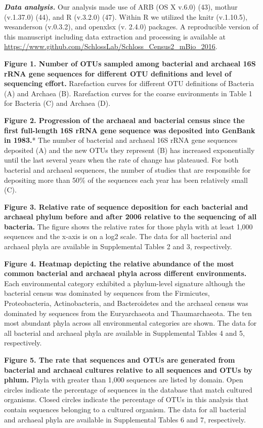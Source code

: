 \documentclass[11pt,]{article}
\begin{document}
\textbf{\emph{Data analysis.}} Our analysis made use of ARB (OS X v.6.0)
(43), mothur (v.1.37.0) (44), and R (v.3.2.0) (47). Within R we utilized
the knitr (v.1.10.5), wesanderson (v.0.3.2), and openxlsx (v. 2.4.0)
packages. A reproducible version of this manuscript including data
extraction and processing is available at
\url{https://www.github.com/SchlossLab/Schloss_Census2_mBio_2016}.

\newpage

\doublespacing

\textbf{Figure 1. Number of OTUs sampled among bacterial and archaeal
16S rRNA gene sequences for different OTU definitions and level of
sequencing effort.} Rarefaction curves for different OTU definitions of
Bacteria (A) and Archaea (B). Rarefaction curves for the coarse
environments in Table 1 for Bacteria (C) and Archaea (D).

\textbf{Figure 2. Progression of the archaeal and bacterial census since
the first full-length 16S rRNA gene sequence was deposited into GenBank
in 1983.}* The number of bacterial and archaeal 16S rRNA gene sequences
deposited (A) and the new OTUs they represent (B) has increased
exponentially until the last several years when the rate of change has
plateaued. For both bacterial and archaeal sequences, the number of
studies that are responsible for depositing more than 50\% of the
sequences each year has been relatively small (C).

\textbf{Figure 3. Relative rate of sequence deposition for each
bacterial and archaeal phylum before and after 2006 relative to the
sequencing of all bacteria.} The figure shows the relative rates for
those phyla with at least 1,000 sequences and the x-axis is on a log2
scale. The data for all bacterial and archaeal phyla are available in
Supplemental Tables 2 and 3, respectively.

\textbf{Figure 4. Heatmap depicting the relative abundance of the most
common bacterial and archaeal phyla across different environments.} Each
environmental category exhibited a phylum-level signature although the
bacterial census was dominated by sequences from the Firmicutes,
Proteobacteria, Actinobacteria, and Bacteroidetes and the archaeal
census was dominated by sequences from the Euryarchaeota and
Thaumarchaeota. The ten most abundant phyla across all environmental
categories are shown. The data for all bacterial and archaeal phyla are
available in Supplemental Tables 4 and 5, respectively.

\textbf{Figure 5. The rate that sequences and OTUs are generated from
bacterial and archaeal cultures relative to all sequences and OTUs by
phlum.} Phyla with greater than 1,000 sequences are listed by domain.
Open circles indicate the percentage of sequences in the database that
match cultured organisms. Closed circles indicate the percentage of OTUs
in this analysis that contain sequences belonging to a cultured
organism. The data for all bacterial and archaeal phyla are available in
Supplemental Tables 6 and 7, respectively.
\end{document}
